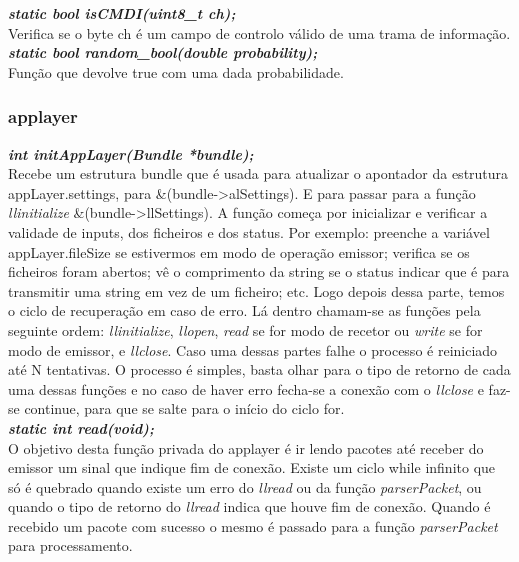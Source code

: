 \documentclass[a4paper]{article}
\begin{document}
\noindent\textbf{\textit{static bool isCMDI(uint8\_t ch);}}\\ Verifica se o
byte ch é um campo de controlo válido de uma trama de informação. \\

\noindent\textbf{\textit{static bool random\_bool(double probability);}}\\
Função que devolve true com uma dada probabilidade.

\subsubsection{applayer} \noindent\textbf{\textit{int initAppLayer(Bundle
*bundle);}}\\ Recebe um estrutura bundle que é usada para atualizar o apontador
da estrutura appLayer.settings, para \&(bundle->alSettings). E para passar para
a função \textit{llinitialize} \&(bundle->llSettings). A função começa por
inicializar e verificar a validade de inputs, dos ficheiros e dos status. Por
exemplo: preenche a variável appLayer.fileSize se estivermos em modo de
operação emissor; verifica se os ficheiros foram abertos; vê o comprimento da
string se o status indicar que é para transmitir uma string em vez de um
ficheiro; etc. Logo depois dessa parte, temos o ciclo de recuperação em caso de
erro. Lá dentro chamam-se as funções pela seguinte ordem:
\textit{llinitialize}, \textit{llopen}, \textit{read} se for modo de recetor ou
\textit{write} se for modo de emissor, e \textit{llclose}. Caso uma dessas
partes falhe o processo é reiniciado até N tentativas. O processo é simples,
basta olhar para o tipo de retorno de cada uma dessas funções e no caso de
haver erro fecha-se a conexão com o \textit{llclose} e faz-se continue, para
que se salte para o início do ciclo for.\\

\noindent\textbf{\textit{static int read(void);}}\\ O objetivo desta função
privada do applayer é ir lendo pacotes até receber do emissor um sinal que
indique fim de conexão. Existe um ciclo while infinito que só é quebrado quando
existe um erro do \textit{llread} ou da função \textit{parserPacket}, ou quando
o tipo de retorno do \textit{llread} indica que houve fim de conexão. Quando é
recebido um pacote com sucesso o mesmo é passado para a função
\textit{parserPacket} para processamento.\\
\end{document}
